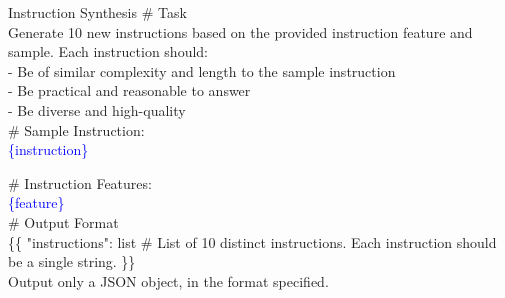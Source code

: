 \begin{promptbox}{Instruction Synthesis}
\# Task \\
Generate 10 new instructions based on the provided instruction feature and sample. Each instruction should: \\
- Be of similar complexity and length to the sample instruction \\
- Be practical and reasonable to answer \\
- Be diverse and high-quality \\

\# Sample Instruction: \\
\textcolor{blue}{\{instruction\}}

\# Instruction Features: \\
\textcolor{blue}{\{feature\}} \\

\# Output Format \\
\{\{
  "instructions": list \# List of 10 distinct instructions. Each instruction should be a single string.
\}\} \\

Output only a JSON object, in the format specified.
\end{promptbox}

